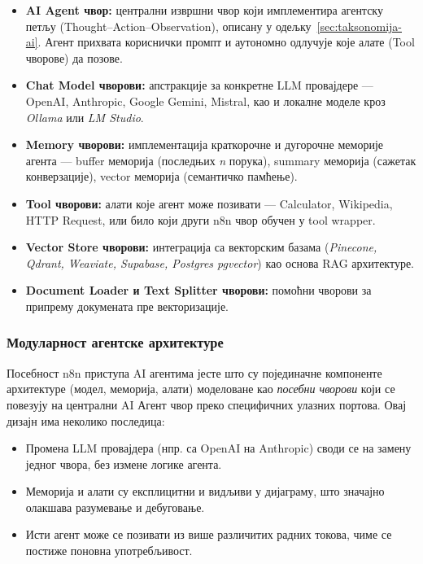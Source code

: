 \begin{itemize}
    \item \textbf{AI Agent чвор:} централни извршни чвор који
    имплементира агентску петљу (Thought–Action–Observation),
    описану у одељку~\ref{sec:taksonomija-ai}. Агент прихвата кориснички промпт и
    аутономно одлучује које алате (Tool чворове) да позове.
    \item \textbf{Chat Model чворови:} апстракције за конкретне
    LLM провајдере — OpenAI, Anthropic, Google Gemini, Mistral,
    као и локалне моделе кроз \textit{Ollama} или \textit{LM Studio}.
    \item \textbf{Memory чворови:} имплементација краткорочне и
    дугорочне меморије агента — buffer меморија (последњих
    \textit{n} порука), summary меморија (сажетак конверзације),
    vector меморија (семантичко памћење).
    \item \textbf{Tool чворови:} алати које агент може позивати —
    Calculator, Wikipedia, HTTP Request, или било који други
    n8n чвор обучен у tool wrapper.
    \item \textbf{Vector Store чворови:} интеграција са векторским
    базама (\textit{Pinecone, Qdrant, Weaviate, Supabase, Postgres
    pgvector}) као основа RAG архитектуре.
    \item \textbf{Document Loader и Text Splitter чворови:}
    помоћни чворови за припрему докумената пре векторизације.
\end{itemize}

\subsubsection{Модуларност агентске архитектуре}

Посебност n8n приступа AI агентима јесте што су појединачне
компоненте архитектуре (модел, меморија, алати) моделоване као
\textit{посебни чворови} који се повезују на централни AI Агент
чвор преко специфичних улазних портова. Овај дизајн има неколико
последица:

\begin{itemize}
    \item Промена LLM провајдера (нпр. са OpenAI на Anthropic)
    своди се на замену једног чвора, без измене логике агента.
    \item Меморија и алати су експлицитни и видљиви у дијаграму,
    што значајно олакшава разумевање и дебуговање.
    \item Исти агент може се позивати из више различитих радних
    токова, чиме се постиже поновна употребљивост.
\end{itemize}


